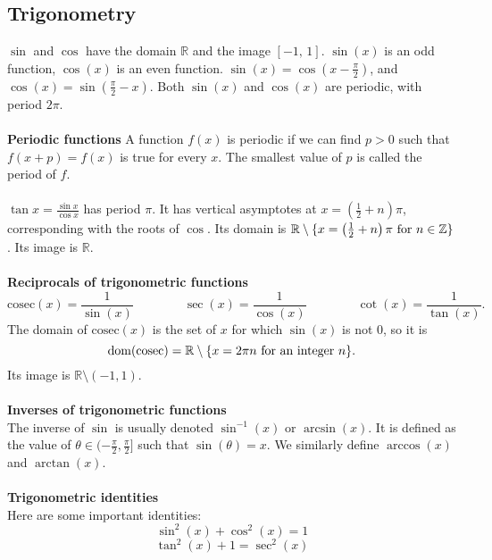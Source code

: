\documentclass[10pt, a4paper]{article}
\newcommand{\Z}{\mathbb{Z}}
\newcommand{\R}{\mathbb{R}}
\begin{document}
\subsection{Trigonometry}
$\sin$ and $\cos$ have the domain $\R$ and the image $[-1,\,1]$. $\sin{(x)}$ is an odd function, $\cos{(x)}$ is an even function. $\sin{(x)} = \cos{(x - \frac{\pi}{2})}$, and $\cos{(x)} = \sin{(\frac{\pi}{2} - x)}$. Both $\sin{(x)}$ and $\cos{(x)}$ are periodic, with period $2\pi$. \\
\\
\textbf{Periodic functions} A function $f(x)$ is periodic if we can find $p > 0$ such that $f(x + p) = f(x)$ is true for every $x$. The smallest value of $p$ is called the period of $f$. \\
\\
$\tan{x} = \frac{\sin{x}}{\cos{x}}$ has period $\pi$. It has vertical asymptotes at $x = \left(\frac{1}{2} + n\right)\pi$, corresponding with the roots of $\cos$. Its domain is $\R \setminus \{x = \left(\frac{1}{2} + n\right)\pi\textnormal{ for } n \in \Z\}$. Its image is $\R$. \\
\\
\textbf{Reciprocals of trigonometric functions} \\
\[
    \mathrm{cosec}{(x)} = \dfrac{1}{\sin{(x)}} \qquad \qquad \sec{(x)} = \dfrac{1}{\cos{(x)}} \qquad \qquad \cot{(x)} = \dfrac{1}{\tan{(x)}}.
\]
The domain of $\mathrm{cosec}(x)$ is the set of $x$ for which $\sin{(x)}$ is not $0$, so it is
\[
\mathrm{dom}(\mathrm{cosec}) = \R \setminus \{x = 2\pi n \textnormal{ for an integer } n\}.
\]
Its image is $\R \setminus (-1, 1)$. \\
\\
\textbf{Inverses of trigonometric functions} \\
The inverse of $\sin$ is usually denoted $\sin^{-1}(x)$ or $\arcsin(x)$. It is defined as the value of $\theta \in (-\frac{\pi}{2}, \frac{\pi}{2}]$ such that $\sin(\theta) = x$. We similarly define $\arccos(x)$ and $\arctan(x)$. \\
\\
\textbf{Trigonometric identities} \\
Here are some important identities:
\[
\sin^2(x) + \cos^2(x) = 1
\]
\[
\tan^2(x) + 1 = \sec^2(x)
\]
\end{document}
